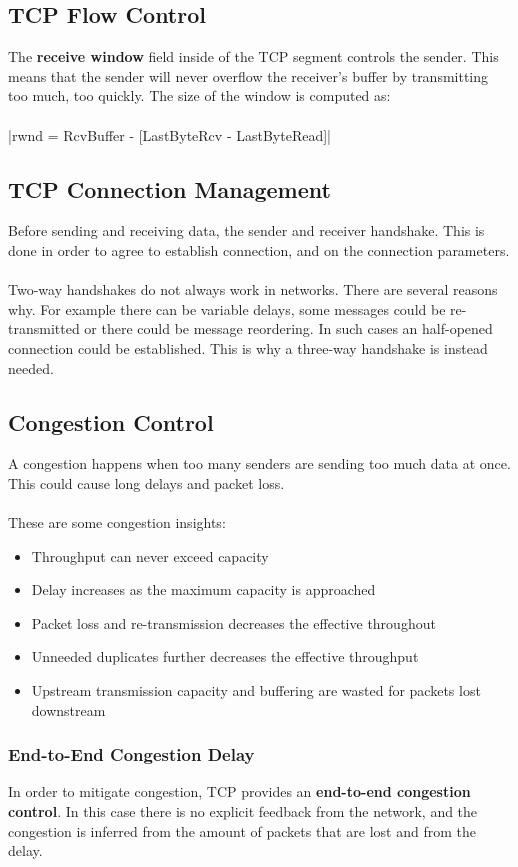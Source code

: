 \documentclass{article}
\begin{document}
\subsection{TCP Flow Control}
The \textbf{receive window} field inside of the TCP segment controls the sender. This means that the sender will never overflow the receiver's buffer by transmitting too much, too quickly. The size of the window is computed as: \\ \\
\cverb|rwnd = RcvBuffer - [LastByteRcv - LastByteRead]|

\subsection{TCP Connection Management}
Before sending and receiving data, the sender and receiver handshake. This is done in order to agree to establish connection, and on the connection parameters. \\ \\
Two-way handshakes do not always work in networks. There are several reasons why. For example there can be variable delays, some messages could be re-transmitted or there could be message reordering. In such cases an half-opened connection could be established. This is why a three-way handshake is instead needed.

\subsection{Congestion Control}
A congestion happens when too many senders are sending too much data at once. This could cause long delays and packet loss. \\ \\
These are some congestion insights:

\begin{itemize}
	\item Throughput can never exceed capacity
	\item Delay increases as the maximum capacity is approached
	\item Packet loss and re-transmission decreases the effective throughout
	\item Unneeded duplicates further decreases the effective throughput
	\item Upstream transmission capacity and buffering are wasted for packets lost downstream
\end{itemize}

\subsubsection{End-to-End Congestion Delay}
In order to mitigate congestion, TCP provides an \textbf{end-to-end congestion control}. In this case there is no explicit feedback from the network, and the congestion is inferred from the amount of packets that are lost and from the delay.
\end{document}

